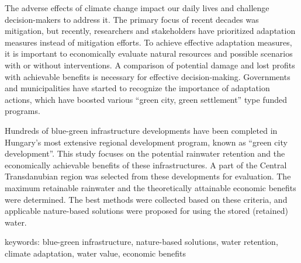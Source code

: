 \noindent

The adverse effects of climate change impact our daily lives and challenge decision-makers to address it. The primary focus of recent decades was mitigation, but recently, researchers and stakeholders have prioritized adaptation measures instead of mitigation efforts. To achieve effective adaptation measures, it is important to economically evaluate natural resources and possible scenarios with or without interventions. A comparison of potential damage and lost profits with achievable benefits is necessary for effective decision-making. Governments and municipalities have started to recognize the importance of adaptation actions, which have boosted various ``green city, green settlement'' type funded programs.

Hundreds of blue-green infrastructure developments have been completed in Hungary's most extensive regional development program, known as ``green city development''. This study focuses on the potential rainwater retention and the economically achievable benefits of these infrastructures. A part of the Central Transdanubian region was selected from these developments for evaluation. The maximum retainable rainwater and the theoretically attainable economic benefits were determined. The best methods were collected based on these criteria, and applicable nature-based solutions were proposed for using the stored (retained) water. 

keywords: blue-green infrastructure, nature-based solutions, water retention, climate adaptation, water value, economic benefits



